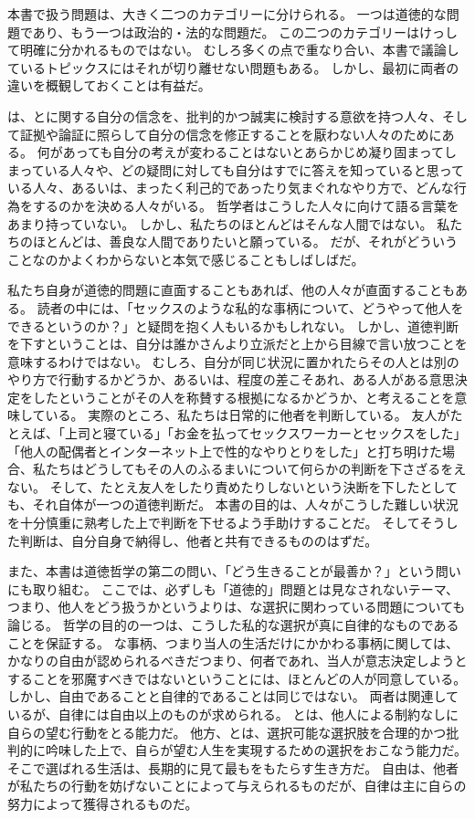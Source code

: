 \documentclass[paper=a4,book,openany]{jlreq} \usepackage{mystyle}
\begin{document}
本書で扱う問題は、大きく二つのカテゴリーに分けられる。
一つは道徳的な問題であり、もう一つは政治的・法的な問題だ。
この二つのカテゴリーはけっして明確に分かれるものではない。
むしろ多くの点で重なり合い、本書で議論しているトピックスにはそれが切り離せない問題もある。
しかし、最初に両者の違いを概観しておくことは有益だ。

は、とに関する自分の信念を、批判的かつ誠実に検討する意欲を持つ人々、そして証拠や論証に照らして自分の信念を修正することを厭わない人々のためにある。
何があっても自分の考えが変わることはないとあらかじめ凝り固まってしまっている人々や、どの疑問に対しても自分はすでに答えを知っていると思っている人々、あるいは、まったく利己的であったり気まぐれなやり方で、どんな行為をするのかを決める人々がいる。
哲学者はこうした人々に向けて語る言葉をあまり持っていない。
しかし、私たちのほとんどはそんな人間ではない。
私たちのほとんどは、善良な人間でありたいと願っている。
だが、それがどういうことなのかよくわからないと本気で感じることもしばしばだ。

私たち自身が道徳的問題に直面することもあれば、他の人々が直面することもある。
読者の中には、「セックスのような私的な事柄について、どうやって他人をできるというのか？」と疑問を抱く人もいるかもしれない。
しかし、道徳判断を下すということは、自分は誰かさんより立派だと上から目線で言い放つことを意味するわけではない。
むしろ、自分が同じ状況に置かれたらその人とは別のやり方で行動するかどうか、あるいは、程度の差こそあれ、ある人がある意思決定をしたということがその人を称賛する根拠になるかどうか、と考えることを意味している。
実際のところ、私たちは日常的に他者を判断している。
友人がたとえば、「上司と寝ている」「お金を払ってセックスワーカーとセックスをした」「他人の配偶者とインターネット上で性的なやりとりをした」と打ち明けた場合、私たちはどうしてもその人のふるまいについて何らかの判断を下さざるをえない。
そして、たとえ友人をしたり責めたりしないという決断を下したとしても、それ自体が一つの道徳判断だ。
本書の目的は、人々がこうした難しい状況を十分慎重に熟考した上で判断を下せるよう手助けすることだ。
そしてそうした判断は、自分自身で納得し、他者と共有できるもののはずだ。

また、本書は道徳哲学の第二の問い、「どう生きることが最善か？」という問いにも取り組む。
ここでは、必ずしも「道徳的」問題とは見なされないテーマ、つまり、他人をどう扱うかというよりは、な選択に関わっている問題についても論じる。
哲学の目的の一つは、こうした私的な選択が真に自律的なものであることを保証する。
な事柄、つまり当人の生活だけにかかわる事柄に関しては、かなりの自由が認められるべきだ{\DDASH}つまり、何者であれ、当人が意志決定しようとすることを邪魔すべきではない{\DDASH}ということには、ほとんどの人が同意している。
しかし、自由であることと自律的であることは同じではない。
両者は関連しているが、自律には自由以上のものが求められる。
とは、他人による制約なしに自らの望む行動をとる能力だ。
他方、とは、選択可能な選択肢を合理的かつ批判的に吟味した上で、自らが望む人生を実現するための選択をおこなう能力だ。
そこで選ばれる生活は、長期的に見て最もをもたらす生き方だ。
自由は、他者が私たちの行動を妨げないことによって与えられるものだが、自律は主に自らの努力によって獲得されるものだ。
\end{document}
